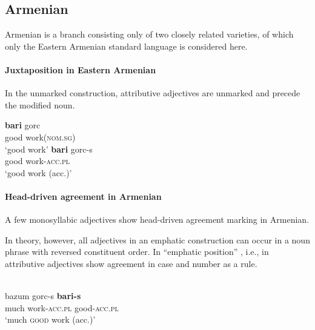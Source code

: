 \subsection{Armenian}
\label{armenian-synch}
Armenian is a branch consisting only of two closely related varieties, of which only the Eastern Armenian standard language is considered here.

\paragraph*{Juxtaposition in Eastern Armenian} 
In the unmarked construction, attributive adjectives are unmarked and precede the modified noun.
\begin{exe}
\begin{xlist}
\ex 
\gll	\textbf{bari} gorc\\
	good work(\textsc{nom.sg})\\
\glt	‘good work’
\ex 
\gll	\textbf{bari} gorc-s\\
	good work-\textsc{acc.pl}\\
\glt	‘good work (acc.)’
\end{xlist}
\end{exe}

\paragraph*{Head\hyp{}driven agreement in Armenian}
A few monosyllabic adjectives show head\hyp{}driven agreement marking in Armenian. 

In theory, however, all adjectives in an emphatic construction can occur in a noun phrase with reversed constituent order. In “emphatic position” \citep[224]{ajello1998}, i.e., in  attributive adjectives show agreement in case and number as a rule.
\begin{exe}
\\
\gll	bazum gorc-s \textbf{bari-s}\\
	much work-\textsc{acc.pl} good-\textsc{acc.pl}\\
\glt	‘much \textsc{good} work (acc.)’
\end{exe}

